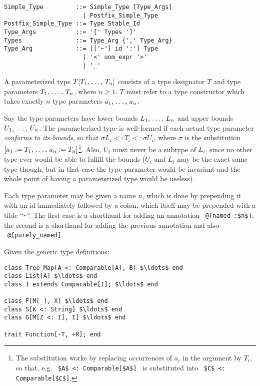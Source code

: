 \syntax\begin{lstlisting}
Simple_Type         ::= Simple_Type [Type_Args]
                      | Postfix_Simple_Type
Postfix_Simple_Type ::= Type Stable_Id
Type_Args           ::= '[' Types ']'
Types               ::= Type_Arg {',' Type_Arg}
Type_Arg            ::= [['~'] id ':'] Type 
                      | '<' uom_expr '>'
                      | '_'
\end{lstlisting}

A parameterized type $T[T_1 ,\, \ldots ,\, T_n]$ consists of a type designator $T$ and type parameters $T_1 ,\, \ldots ,\, T_n$, where $n \geq 1$. $T$ must refer to a type constructor which takes exactly $n$ type parameters $a_1 ,\, \ldots ,\, a_n$. 

Say the type parameters have lower bounds $L_1 ,\, \ldots ,\, L_n$ and upper bounds $U_1 ,\, \ldots ,\, U_n$. The parameterized type is well-formed if each actual type parameter {\em conforms to its bounds}, so that $\sigma L_i <: T_i <: \sigma U_i$, where $\sigma$ is the substitution $[a_1 := T_1 ,\, \ldots ,\, a_n := T_n]$\footnote{The substitution works by replacing occurrences of $a_i$ in the argument by $T_i$, so that, e.g. ~\lstinline!$A$ <: Comparable[$A$]!~ is substituted into ~\lstinline!$C$ <: Comparable[$C$]!.}. Also, $U_i$ must never be a subtype of $L_i$, since no other type ever would be able to fulfill the bounds ($U_i$ and $L_i$ may be the exact same type though, but in that case the type parameter would be invariant and the whole point of having a parameterized type would be useless). 

Each type parameter may be given a name $n$, which is done by prepending it with an id immediately followed by a colon, which itself may be prepended with a tilde ``\lstinline!~!''. The first case is a shorthand for adding an annotation ~\lstinline!@[named :$n$]!, the second is a shorthand for adding the previous annotation and also ~\lstinline!@[purely_named]!. 

\example
\label{example:parameterized-types}
Given the generic type definitions: 

\begin{lstlisting}
class Tree_Map[A <: Comparable[A], B] $\ldots$ end
class List[A] $\ldots$ end
class I extends Comparable[I]; $\ldots$ end

class F[M[_], X] $\ldots$ end
class S[K <: String] $\ldots$ end
class G[M[Z <: I], I] $\ldots$ end

trait Function[-T, +R]; end
\end{lstlisting}

